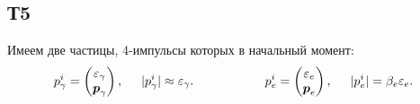 \subsection*{Т5}

Имеем две частицы, 4-импульсы которых в начальный момент:
\begin{equation*}
	p_\gamma^i = \begin{pmatrix}\varepsilon_\gamma \\ \mbox{\boldmath $p$}_\gamma \end{pmatrix},
	\hspace{0.5 cm}
	|p_\gamma^i| \approx \varepsilon_\gamma.
	\hspace{2 cm}
	p_e^i = \begin{pmatrix} \varepsilon_e \\ \mbox{\boldmath $p$}_e\end{pmatrix},
	\hspace{0.5 cm}
	|p_e^i| =\beta_e \varepsilon_e.
\end{equation*}

